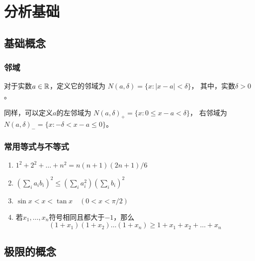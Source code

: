 \chapter{分析基础}

\section{基础概念}
\subsection{邻域}
对于实数$a\in\mathbb{R}$，定义它的邻域为
$N(a,\delta) = \{ x: |x-a| < \delta \}$，
其中，实数$\delta > 0$。

同样，可以定义$a$的左邻域为
$N(a,\delta)_+ = \{ x: 0 \le x - a < \delta \}$，
右邻域为
$N(a,\delta)_- = \{ x: -\delta < x - a \le 0  \}$。

\subsection{常用等式与不等式}
\begin{enumerate}
  \item 
  $1^2+2^2+\dots +n^2 = n(n+1)(2n+1)/6$
  \item
  $(\sum_{i}a_i b_i)^2 \le (\sum_{i}a_i^2)(\sum_{i}b_i)^2$
  \item
  $\sin x < x < \tan x \quad (0 < x < \pi/2)$
  \item
  若$x_1,\dots,x_n$符号相同且都大于$-1$，那么
  \[(1+x_1)(1+x_2)\dots(1+x_n)\ge 1+x_1+x_2+\dots+x_n\]
\end{enumerate}

\section{极限的概念}